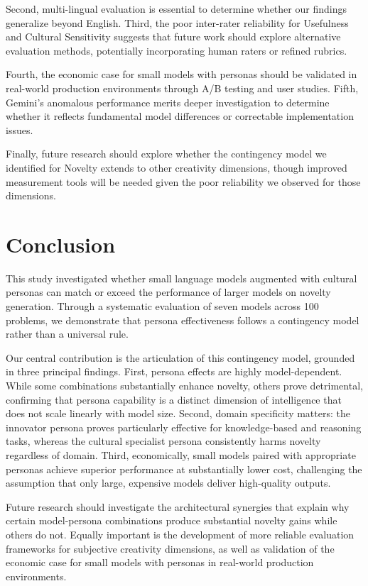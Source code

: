 \documentclass{article}
\begin{document}
Second, multi-lingual evaluation is essential to determine whether our findings generalize beyond English. Third, the poor inter-rater reliability for Usefulness and Cultural Sensitivity suggests that future work should explore alternative evaluation methods, potentially incorporating human raters or refined rubrics.

Fourth, the economic case for small models with personas should be validated in real-world production environments through A/B testing and user studies. Fifth, Gemini's anomalous performance merits deeper investigation to determine whether it reflects fundamental model differences or correctable implementation issues.

Finally, future research should explore whether the contingency model we identified for Novelty extends to other creativity dimensions, though improved measurement tools will be needed given the poor reliability we observed for those dimensions.


\section{Conclusion}

This study investigated whether small language models augmented with cultural personas can match or exceed the performance of larger models on novelty generation. Through a systematic evaluation of seven models across 100 problems, we demonstrate that persona effectiveness follows a contingency model rather than a universal rule.

Our central contribution is the articulation of this contingency model, grounded in three principal findings. First, persona effects are highly model-dependent. While some combinations substantially enhance novelty, others prove detrimental, confirming that persona capability is a distinct dimension of intelligence that does not scale linearly with model size. Second, domain specificity matters: the innovator persona proves particularly effective for knowledge-based and reasoning tasks, whereas the cultural specialist persona consistently harms novelty regardless of domain. Third, economically, small models paired with appropriate personas achieve superior performance at substantially lower cost, challenging the assumption that only large, expensive models deliver high-quality outputs.

Future research should investigate the architectural synergies that explain why certain model-persona combinations produce substantial novelty gains while others do not. Equally important is the development of more reliable evaluation frameworks for subjective creativity dimensions, as well as validation of the economic case for small models with personas in real-world production environments.
\end{document}

